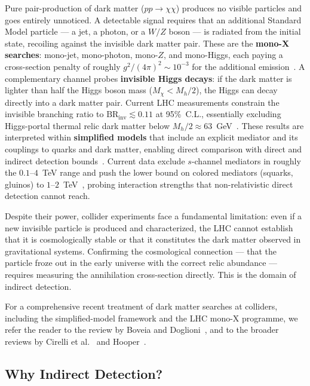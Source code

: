 Pure pair-production of dark matter ($pp \to \chi\chi$) produces no visible particles and goes entirely unnoticed.
A detectable signal requires that an additional Standard Model particle --- a jet, a photon, or a $W/Z$ boson --- is radiated from the initial state, recoiling against the invisible dark matter pair.
These are the \textbf{mono-X searches}: mono-jet, mono-photon, mono-$Z$, and mono-Higgs, each paying a cross-section penalty of roughly $g^2/(4\pi)^2 \sim 10^{-3}$ for the additional emission~\cite{Cirelli:2024ssz}.
A complementary channel probes \textbf{invisible Higgs decays}: if the dark matter is lighter than half the Higgs boson mass ($M_\chi < M_h/2$), the Higgs can decay directly into a dark matter pair.
Current LHC measurements constrain the invisible branching ratio to $\text{BR}_\text{inv} \lesssim 0.11$ at 95\%~C.L., essentially excluding Higgs-portal thermal relic dark matter below $M_h/2 \approx 63$~GeV~\cite{ATLAS:2023tkt,Cirelli:2024ssz}.
These results are interpreted within \textbf{simplified models} that include an explicit mediator and its couplings to quarks and dark matter, enabling direct comparison with direct and indirect detection bounds~\cite{Boveia:2018yeb}.
Current data exclude $s$-channel mediators in roughly the $0.1$--$4$~TeV range and push the lower bound on colored mediators (squarks, gluinos) to $1$--$2$~TeV~\cite{Cirelli:2024ssz,Hooper:2024}, probing interaction strengths that non-relativistic direct detection cannot reach.

Despite their power, collider experiments face a fundamental limitation: even if a new invisible particle is produced and characterized, the LHC cannot establish that it is cosmologically stable or that it constitutes the dark matter observed in gravitational systems.
Confirming the cosmological connection --- that the particle froze out in the early universe with the correct relic abundance --- requires measuring the annihilation cross-section directly.
This is the domain of indirect detection.

For a comprehensive recent treatment of dark matter searches at colliders, including the simplified-model framework and the LHC mono-X programme, we refer the reader to the review by Boveia and Doglioni~\cite{Boveia:2018yeb}, and to the broader reviews by Cirelli et al.~\cite{Cirelli:2024ssz} and Hooper~\cite{Hooper:2024}.

\subsection{Why Indirect Detection?}
\label{sec:1.3.3}

